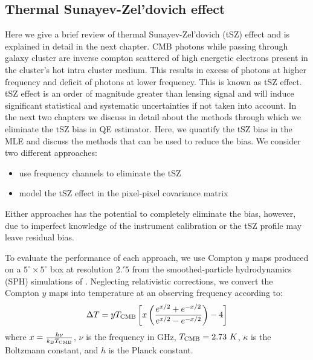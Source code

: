  \subsection{Thermal Sunayev-Zel'dovich effect}
 \label{tSZ_effect_bias}
Here we give a brief review of thermal Sunayev-Zel'dovich (tSZ) effect and is explained in detail in the next chapter.
CMB photons while passing through galaxy cluster are inverse compton scattered of high energetic electrons present in the cluster's hot intra cluster medium.
This results in excess of photons at higher frequency and deficit of photons at lower frequency.
 This is known as tSZ effect.
tSZ effect is an order of magnitude greater than lensing signal and will induce significant statistical and systematic uncertainties if not taken into account.
In the next two chapters we discuss in detail about the methods through which we eliminate the tSZ bias in QE estimator.
Here, we quantify the tSZ bias in the MLE and discuss the methods that can be used to reduce the bias.
We consider two different approaches:
\begin{itemize}
\item use frequency channels to eliminate the tSZ
\item model the tSZ effect in the pixel-pixel covariance matrix
\end{itemize}
Either approaches has the potential to completely eliminate the bias, however, due to imperfect knowledge of the instrument calibration or the tSZ profile may leave residual bias. 


To evaluate the performance of each approach,  we use Compton $y$ maps produced on a $5^{\circ} \times 5^{\circ}$ box at resolution $2.'5$ from the smoothed-particle hydrodynamics (SPH) simulations of  \citet{mccarthy13}.
Neglecting relativistic corrections, we convert the Compton $y$ maps into temperature at an observing frequency according to:
\begin{eqnarray}
\Delta T = y T_{\rm CMB} \left[x \left(\frac{e^{x/2} + e^{-x/2}}{e^{x/2} - e^{-x/2}}  \right) - 4\right ]
\end{eqnarray} where $x = \frac{h\nu}{k_{\rm B}T_{\rm CMB}}$, $\nu$ is the frequency in GHz, $T_{\rm CMB} = 2.73\ K$, $\kappa$ is the Boltzmann constant, and $h$ is the Planck constant.

